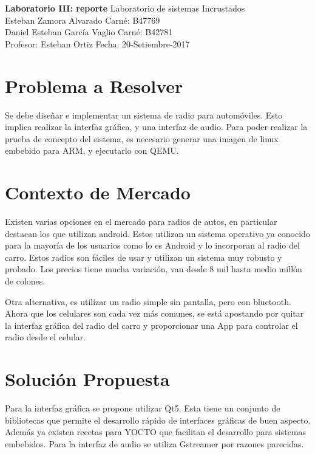 

\noindent
\large\textbf{Laboratorio III: reporte} \hfill Laboratorio de sistemas Incrustados \\
\normalsize Esteban Zamora Alvarado \hfill Carné: B47769 \\
Daniel Esteban García Vaglio \hfill Carné: B42781 \\
Profesor: Esteban Ortiz  \hfill Fecha: 20-Setiembre-2017 \\

\section{Problema a Resolver}
\label{sec:Problem}
Se debe diseñar e implementar un sistema de radio para automóviles. Esto implica realizar la
interfaz gráfica, y una interfaz de audio. Para poder realizar la prueba de concepto del sistema, es
necesario generar una imagen de linux embebido para ARM, y ejecutarlo con QEMU. 

\section{Contexto de Mercado}
\label{sec:Context}
Existen varias opciones en el mercado para radios de autos, en particular destacan los que utilizan
android. Estos utilizan un sistema operativo ya conocido para la mayoría de los usuarios como lo es
Android y lo incorporan al radio del carro. Estos radios son fáciles de usar y utilizan un sistema
muy robusto y probado. Los precios tiene mucha variación, van desde 8 mil hasta medio millón de
colones.

Otra alternativa, es utilizar un radio simple sin pantalla, pero con bluetooth. Ahora que los
celulares son cada vez más comunes, se está apostando por quitar la interfaz gráfica del radio del
carro y proporcionar una App para controlar el radio desde el celular.  


\section{Solución Propuesta}
\label{sec:solution}
Para la interfaz gráfica se propone utilizar Qt5. Esta tiene un conjunto de bibliotecas que permite
el desarrollo rápido de interfaces gráficas de buen aspecto. Además ya existen recetas para YOCTO
que facilitan el desarrollo para sistemas embebidos. Para la interfaz de audio se utiliza Gstreamer
por razones parecidas.

